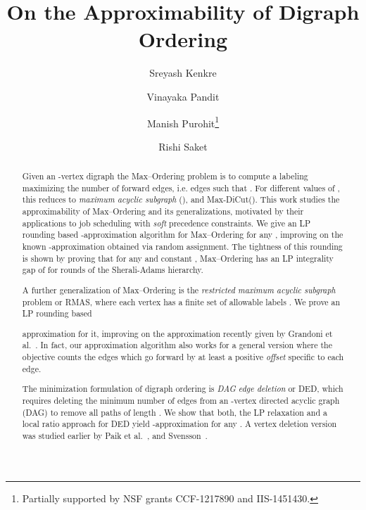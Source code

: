 \documentclass[oribibl]{llncs}
\title{On the Approximability of Digraph Ordering}
\author{Sreyash Kenkre\inst{1}
	\and Vinayaka Pandit\inst{1}
        \and Manish Purohit\inst{2}\thanks{Partially supported by NSF grants CCF-1217890 and IIS-1451430.}
	\and Rishi Saket\inst{1}}
\institute{IBM Research, Bangalore, Karnataka 560045, India \\ {\tt
		\{srekenkr, pvinayak, rissaket\}@in.ibm.com}  \and 
		University of Maryland, College Park, MD 20742, USA \\ {\tt
	manishp@cs.umd.edu}}
\newcommand{\maxk}{{\sc Max--Ordering}\xspace}
\newcommand{\maxdi}{{\sc Max-DiCut}\xspace}
\newcommand{\mink}{{\sc DED}\xspace}
\newcommand{\rmas}{{\sc RMAS}\xspace}
\begin{document}
\maketitle

\begin{abstract}
	Given an -vertex digraph  the 
	\maxk problem is to compute a labeling  
	maximizing the number of forward edges, i.e. edges 
	 such that . For
	different values of , this reduces to
	\emph{maximum acyclic subgraph} (),
	and \maxdi (). This work studies the approximability
	of \maxk and its generalizations, motivated by their
	applications to job scheduling with \emph{soft} precedence
	constraints. 
	We give an LP rounding based
	-approximation algorithm for \maxk for any ,
	improving on the known -approximation
	obtained via
	random assignment.
	The tightness of this
	rounding is shown by proving that for any  and
	constant , 
	\maxk has an
	LP integrality gap of  for
	 rounds of
	the Sherali-Adams hierarchy.

	\smallskip
	A further generalization of \maxk is the \emph{restricted
	maximum acyclic subgraph} problem or \rmas, where each vertex
	 has a finite set of allowable labels . We prove an LP rounding based
	
	approximation for it, improving on the  approximation recently given by Grandoni et
	al.~\cite{grandoni2015lp}. In fact, our approximation algorithm also works for a
	general version where the objective counts the edges which go
	forward by at least a positive \emph{offset} specific to each
	edge. 
	
	\smallskip
	The minimization formulation of digraph
	ordering is \emph{DAG edge deletion} or \mink, which
	requires deleting the minimum number of edges from an
	-vertex directed
	acyclic graph (DAG) to remove all paths of length .
	We show that both, the LP relaxation
	and a local ratio approach for \mink yield -approximation 
	for any
	.
	A vertex deletion
	version was studied earlier by Paik et al.~\cite{paik1994deleting}, 
	and
	Svensson~\cite{svensson2012hardness}. 
\end{abstract}
\end{document}

